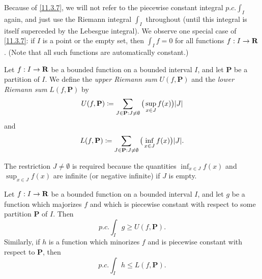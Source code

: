 \begin{remark}\label{11.3.8}
  Because of \cref{11.3.7}, we will not refer to the piecewise constant integral \(p.c. \int_I\) again, and just use the Riemann integral \(\int_I\) throughout
  (until this integral is itself superceded by the Lebesgue integral).
  We observe one special case of \cref{11.3.7}:
  if \(I\) is a point or the empty set, then \(\int_I f = 0\) for all functions \(f : I \to \mathbf{R}\).
  (Note that all such functions are automatically constant.)
\end{remark}

\begin{definition}\label{11.3.9}
  Let \(f : I \to \mathbf{R}\) be a bounded function on a bounded interval \(I\), and let \(\mathbf{P}\) be a partition of \(I\).
  We define the \emph{upper Riemann sum} \(U(f, \mathbf{P})\) and the \emph{lower Riemann sum} \(L(f, \mathbf{P})\) by
  \[
    U(f, \mathbf{P}) \coloneqq \sum_{J \in \mathbf{P} : J \neq \emptyset} \big(\sup_{x \in J} f(x)\big) \abs{J}
  \]
  and
  \[
    L(f, \mathbf{P}) \coloneqq \sum_{J \in \mathbf{P} : J \neq \emptyset} \big(\inf_{x \in J} f(x)\big) \abs{J}.
  \]
\end{definition}

\begin{remark}\label{11.3.10}
  The restriction \(J \neq \emptyset\) is required because the quantities \(\inf_{x \in J} f(x)\) and \(\sup_{x \in J} f(x)\) are infinite (or negative infinite) if \(J\) is empty.
\end{remark}

\begin{lemma}\label{11.3.11}
  Let \(f : I \to \mathbf{R}\) be a bounded function on a bounded interval \(I\), and let \(g\) be a function which majorizes \(f\) and which is piecewise constant with respect to some partition \(\mathbf{P}\) of \(I\).
  Then
  \[
    p.c. \int_I g \geq U(f, \mathbf{P}).
  \]
  Similarly, if \(h\) is a function which minorizes \(f\) and is piecewise constant with respect to \(\mathbf{P}\), then
  \[
    p.c. \int_I h \leq L(f, \mathbf{P}).
  \]
\end{lemma}

